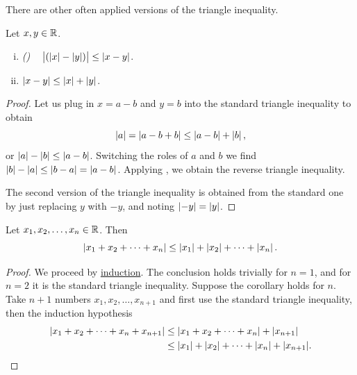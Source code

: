 There are other often applied versions of the triangle inequality.

\begin{cor}
Let $x,y \in {\mathbb{R}}$.
\begin{enumerate}[(i)]
\item \emph{()}
~
$\bigl\lvert (\left\lvert {x} \right\rvert-\left\lvert {y} \right\rvert) \bigr\rvert \leq \left\lvert {x-y} \right\rvert$.
\item $\left\lvert {x-y} \right\rvert \leq \left\lvert {x} \right\rvert+\left\lvert {y} \right\rvert$.
\end{enumerate}
\end{cor}

\begin{proof}
Let us plug in $x=a-b$ and $y=b$ into the standard
triangle inequality to obtain
\begin{equation*}
\left\lvert {a} \right\rvert = \left\lvert {a-b+b} \right\rvert \leq \left\lvert {a-b} \right\rvert + \left\lvert {b} \right\rvert ,
\end{equation*}
or $\left\lvert {a} \right\rvert-\left\lvert {b} \right\rvert \leq \left\lvert {a-b} \right\rvert$.  Switching the roles of $a$ and $b$
we find 
$\left\lvert {b} \right\rvert-\left\lvert {a} \right\rvert \leq \left\lvert {b-a} \right\rvert = \left\lvert {a-b} \right\rvert$.  Applying
, we obtain the reverse triangle
inequality.

The second version of the triangle inequality is obtained from the standard
one by just replacing $y$ with $-y$, and noting $\left\lvert {-y} \right\rvert =
\left\lvert {y} \right\rvert$.
\end{proof}

\begin{cor}
Let $x_1, x_2, \ldots, x_n \in {\mathbb{R}}$.  Then
\begin{equation*}
\left\lvert {x_1 + x_2 + \cdots + x_n} \right\rvert \leq 
\left\lvert {x_1} \right\rvert + \left\lvert {x_2} \right\rvert + \cdots + \left\lvert {x_n} \right\rvert .
\end{equation*}
\end{cor}

\begin{proof}
We proceed by \hyperref[induction:thm]{induction}.
The conclusion holds trivially for $n=1$, and
for $n=2$ it is the standard triangle inequality.  Suppose the corollary
holds for $n$.  Take $n+1$ numbers $x_1,x_2,\ldots,x_{n+1}$ and 
first use the standard triangle inequality, then the induction
hypothesis
\begin{equation*}
\begin{split}
\lvert {x_1 + x_2 + \cdots + x_n + x_{n+1}} \rvert & \leq 
\lvert {x_1 + x_2 + \cdots + x_n} \rvert + \lvert {x_{n+1}} \rvert \\
& \leq 
\lvert {x_1} \rvert + \lvert {x_2} \rvert + \cdots + \lvert {x_n} \rvert + \lvert {x_{n+1}} \rvert .  \qedhere
\end{split}
\end{equation*}
\end{proof}

